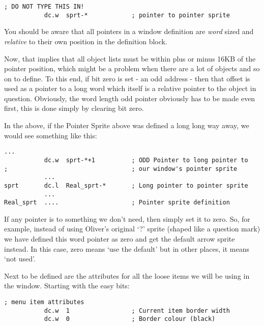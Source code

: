 \begin{lstlisting}[firstnumber=1,caption={Do Not Type This In!}]
           ; DO NOT TYPE THIS IN!
           dc.w  sprt-*            ; pointer to pointer sprite
\end{lstlisting}

You should be aware that all pointers in a window definition are
 \emph{word} sized and \emph{relative} to their
    own position in the definition block.

Now, that implies that all object lists must be within plus or minus
    16KB of the pointer position, which might be a problem when there are a
    lot of objects and so on to define. To this end, if bit zero is set -{} an
    odd address -{} then that offset is used as a pointer to a long word which
    itself is a relative pointer to the object in question. Obviously, the
    word length odd pointer obviously has to be made even first, this is done
    simply by clearing bit zero.

In the above, if the Pointer Sprite above was defined a long long
    way away, we would see something like this:

\begin{lstlisting}[firstnumber=1,caption={Do Not Type This In Either!}]
...
           dc.w  sprt-*+1          ; ODD Pointer to long pointer to
;                                  ; our window's pointer sprite
           ...
sprt       dc.l  Real_sprt-*       ; Long pointer to pointer sprite
           ...
Real_sprt  ....                    ; Pointer sprite definition
\end{lstlisting}

If any pointer is to something we don't need, then simply set it to
    zero. So, for example, instead of using Oliver's original `?' sprite
    (shaped like a question mark) we have defined this word pointer as zero
    and get the default arrow sprite instead. In this case, zero means `use
    the default' but in other places, it means `not used'.

Next to be defined are the attributes for all the loose items we
    will be using in the window. Starting with the easy bits:

\begin{lstlisting}[firstnumber=14,caption={Main Window - Current Loose Item - Border Attributes} ]
; menu item attributes
           dc.w  1                 ; Current item border width  
           dc.w  0                 ; Border colour (black)
\end{lstlisting}

